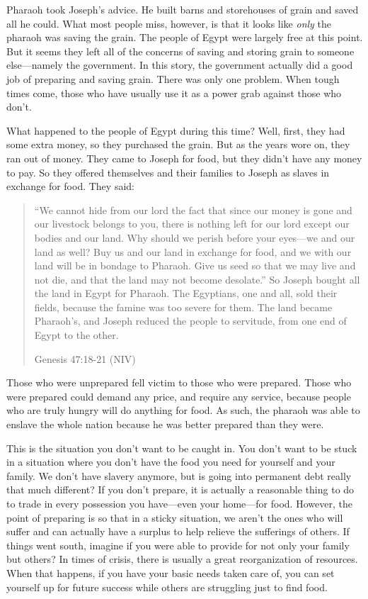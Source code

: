 Pharaoh took Joseph’s
advice. He built barns and storehouses of grain and saved all
he could. What most
people miss, however, is that it looks like \textit{only} the pharaoh
was saving the grain. The people of Egypt were largely free at this
point. But it seems they left all of the concerns of saving and storing
grain to someone else—namely the government. In this story, the
government actually did a good job of preparing and saving grain. There
was only one problem. When tough times come, those who have usually use
it as a power grab against those who don’t.

What happened to the people of Egypt during this time? Well, first, they
had some extra money, so they purchased the grain. But as the years
wore on, they ran out of money. They came to Joseph for food, but they
didn’t have any money to pay. So they offered themselves and their
families to Joseph as slaves in exchange for food. They said:

\begin{quote}
“We cannot hide from our lord the fact that since our money is gone and
our livestock belongs to you, there is nothing left for our lord except
our bodies and our land. Why should we perish before your eyes—we and
our land as well?  Buy us and our land in exchange for food, and we
with our land will be in bondage to Pharaoh. Give us seed so that we
may live and not die, and that the land may not become desolate.”  So
Joseph bought all the land in Egypt for Pharaoh. The Egyptians, one and
all, sold their fields, because the famine was too severe for them. The
land became Pharaoh’s, and Joseph reduced the people to servitude, from
one end of Egypt to the other. 

Genesis 47:18-21 (NIV)
\end{quote}

Those who were unprepared fell victim to those who were prepared. Those
who were prepared could demand any price, and require any service,
because people who are truly hungry will do anything for food. As such,
the pharaoh was able to enslave the whole nation because he was better
prepared than they were.

This is the situation you don’t want to be caught in. You don’t want to
be stuck in a situation where you don’t have the food you need for
yourself and your family. We don’t have slavery anymore, but is going
into permanent debt really that much different?  If you don’t prepare,
it is actually a reasonable thing to do to trade in every possession
you have—even your home—for food. However, the point of preparing is so
that in a sticky situation, we aren’t the ones who will suffer and can
actually have a surplus to help relieve the sufferings of others. If
things went south, imagine if you were able to provide for not only
your family but others?  In times of crisis, there is usually a great
reorganization of resources. When that happens, if you have your basic
needs taken care of, you can set yourself up for future success while
others are struggling just to find food.

